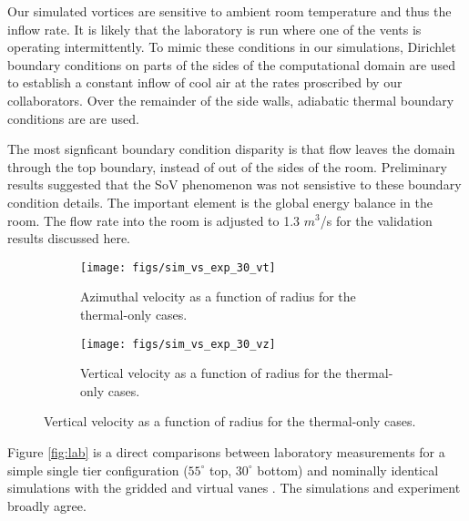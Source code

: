 Our simulated vortices are sensitive to ambient room temperature and thus 
the inflow rate. It is likely that the laboratory is run where one of
the vents is operating intermittently. 
To mimic these conditions in our simulations, Dirichlet boundary conditions 
on parts of the sides of the computational domain are used to
establish a constant inflow of cool air at the rates 
proscribed by our collaborators. Over the remainder of the side walls, 
adiabatic thermal boundary conditions are are used. 

The most signficant boundary condition disparity is that
flow leaves the domain through the top boundary, instead of out
of the sides of the room. Preliminary results suggested that the SoV phenomenon 
was not sensistive to these boundary condition details. The important element is the 
global energy balance in the room. The flow rate into the room is adjusted to 
1.3 $m^3$/s for the validation results discussed here. 


\begin{figure}[htb]

 \begin{subfigure}{.5\textwidth}
  \centering
  \texttt{[image: figs/sim\_vs\_exp\_30\_vt]}
  \caption{Azimuthal velocity as a function of radius for the thermal-only cases.}
 \end{subfigure}%
 \begin{subfigure}{.5\textwidth}
  \centering
  \texttt{[image: figs/sim\_vs\_exp\_30\_vz]}%
  \caption{Vertical velocity as a function of radius for the thermal-only cases.} 
 \end{subfigure}%
  \label{fig:val_lab}  
\end{figure}


Figure \ref{fig:lab} is a direct comparisons between laboratory measurements for a simple 
single tier configuration ($55^{\circ}$ top, $30^{\circ}$ bottom) and 
nominally identical simulations with the gridded and virtual vanes .
The simulations and experiment broadly
agree. 

